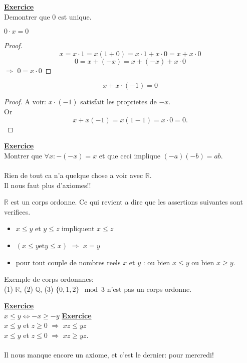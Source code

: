 \documentclass[../main.tex]{subfiles}
\begin{document}
\underline{\textbf{Exercice}}\\
Demontrer que $0$ est unique.

\begin{propo}\label{propo:annulation_de_l_element_neutre}
	$0\cdot x = 0$
\end{propo}
\begin{proof}
	\[ 
		x = x \cdot 1 = x(1+0) = x\cdot 1 + x \cdot 0 = x + x \cdot 0
	\]
	\[ 
		0 = x + (-x) = x + ( -x) + x \cdot 0
	\]
	$\Rightarrow$ $0=x\cdot 0$
	

\end{proof}

\begin{crly}\label{lemma:x_fois_moins_1_egale_x}
\[ 
	x + x \cdot (-1) = 0
\]
	
\end{crly}
\begin{proof}
	A voir: $x \cdot ( -1)$ satisfait les proprietes de $-x$.\\
	Or
	\[ 
		x + x(-1) = x(1-1) = x \cdot 0 =0.
	\]
	
\end{proof}
\underline{\textbf{Exercice}}\\
Montrer que $\forall x: -(-x)=x$ et que ceci implique $(-a)(-b) = ab$.\\
\hr\\

Rien de tout ca n'a quelque chose a voir avec $\mathbb{R}$.\\
Il nous faut plus d'axiomes!!
\begin{axiom}\label{axiom:nombres_reels_ii}
$\mathbb{R}$ est un corps ordonne. Ce qui revient a dire que les assertions suivantes sont verifiees.
\begin{itemize}
	\item $x \leq y$ et $y \leq z$ impliquent $x \leq z$ \\
	\item $(x \leq y \text{et} y \leq x)$ $\Rightarrow$ $x=y$
	\item pour tout couple de nombres reels  $x$ et $y$ : ou bien $x \leq y$ ou bien $x \geq y$.
\end{itemize}
\end{axiom}

Exemple de corps ordonnnes:\\
(1) $\mathbb{R}$, (2) $\mathbb{Q}$, (3) $\{0,1,2\} \mod 3$ n'est pas un corps ordonne.

\underline{\textbf{Exercice}}\\
$x \leq y \iff -x \geq -y$ 
\underline{\textbf{Exercice}}\\
$x \leq y$ et $z \geq 0$ $\Rightarrow$ $xz \leq yz$ \\
$x \leq y $ et $z \leq 0$ $\Rightarrow$ $xz \geq yz$.\\
\hr\\
Il nous manque encore un axiome, et c'est le dernier: pour mercredi!\\
\end{document}
